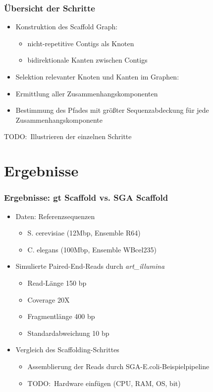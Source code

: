 \documentclass[xcolor=pst]{beamer}
\begin{document}
\begin{frame}
  \frametitle{Übersicht der Schritte}
  \begin{itemize}
  \item Konstruktion des Scaffold Graph:
    \begin{itemize}
    \item nicht-repetitive Contigs als Knoten
    \item bidirektionale Kanten zwischen Contigs
    \end{itemize}
  \item Selektion relevanter Knoten und Kanten im  Graphen:
  \item Ermittlung aller Zusammenhangskomponenten
  \item Bestimmung des Pfades mit größter Sequenzabdeckung für jede
    Zusammenhangskomponente
  \end{itemize}
  TODO:\ Illustrieren der einzelnen Schritte
\end{frame}

\section{Ergebnisse}

\begin{frame} %
  \frametitle{Ergebnisse: gt Scaffold vs. SGA Scaffold}
  \begin{itemize}
    \item Daten: Referenzsequenzen
    \begin{itemize}
      \item S. cerevisiae (12Mbp, Ensemble R64)
      \item C. elegans (100Mbp, Ensemble WBcel235)
    \end{itemize}
    \item Simulierte Paired-End-Reads durch \textit{art\_illumina}
    \begin{itemize}
      \item Read-Länge 150 bp
      \item Coverage 20X
      \item Fragmentlänge 400 bp
      \item Standardabweichung 10 bp
    \end{itemize}
    \item Vergleich des Scaffolding-Schrittes
    \begin{itemize}
      \item Assemblierung der Reads durch SGA-E.coli-Beispielpipeline
      \item TODO:\ Hardware einfügen (CPU, RAM, OS, bit)
    \end{itemize}
  \end{itemize}
  \let\thefootnote\relax{}
\end{frame}
\end{document}
